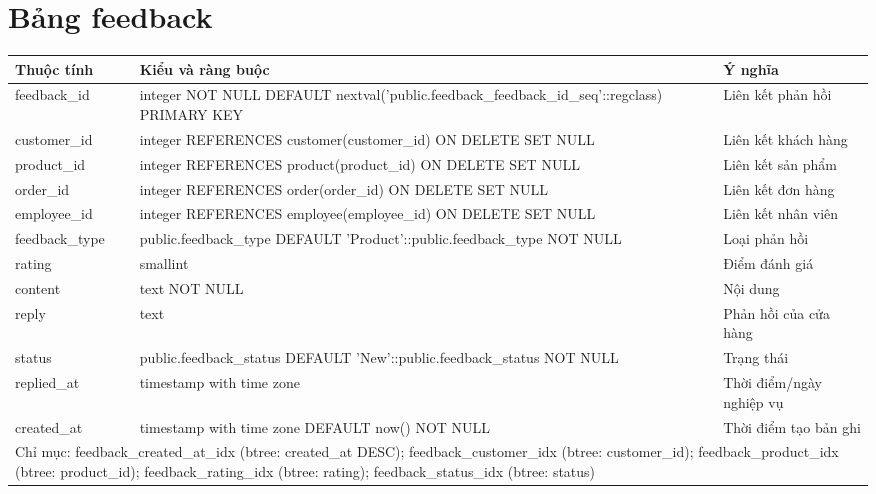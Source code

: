 \section{Bảng feedback}
\begin{longtable}{|p{}|p{}|p{}|}\hline
\textbf{Thuộc tính}&\textbf{Kiểu và ràng buộc}&\textbf{Ý nghĩa}\\\hline\endhead
feedback\_id & integer NOT NULL DEFAULT nextval('public.feedback\_feedback\_id\_seq'::regclass) PRIMARY KEY & Liên kết phản hồi\\\hline
customer\_id & integer REFERENCES customer(customer\_id) ON DELETE SET NULL & Liên kết khách hàng\\\hline
product\_id & integer REFERENCES product(product\_id) ON DELETE SET NULL & Liên kết sản phẩm\\\hline
order\_id & integer REFERENCES order(order\_id) ON DELETE SET NULL & Liên kết đơn hàng\\\hline
employee\_id & integer REFERENCES employee(employee\_id) ON DELETE SET NULL & Liên kết nhân viên\\\hline
feedback\_type & public.feedback\_type DEFAULT 'Product'::public.feedback\_type NOT NULL & Loại phản hồi\\\hline
rating & smallint & Điểm đánh giá\\\hline
content & text NOT NULL & Nội dung\\\hline
reply & text & Phản hồi của cửa hàng\\\hline
status & public.feedback\_status DEFAULT 'New'::public.feedback\_status NOT NULL & Trạng thái\\\hline
replied\_at & timestamp with time zone & Thời điểm/ngày nghiệp vụ\\\hline
created\_at & timestamp with time zone DEFAULT now() NOT NULL & Thời điểm tạo bản ghi\\\hline
\multicolumn{3}{|p{0.93\textwidth}|}{Chỉ mục: feedback\_created\_at\_idx (btree: created\_at DESC); feedback\_customer\_idx (btree: customer\_id); feedback\_product\_idx (btree: product\_id); feedback\_rating\_idx (btree: rating); feedback\_status\_idx (btree: status)}\\\hline
\end{longtable}
\normalsize
